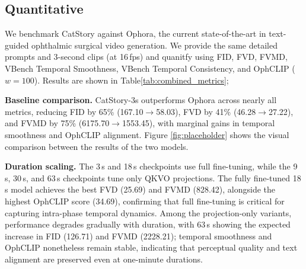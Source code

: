 \documentclass[runningheads]{llncs}
\begin{document}
\subsection{Quantitative}
We benchmark CatStory against Ophora\cite{LiWei_Ophora_MICCAI2025}, the current state-of-the-art in text-guided ophthalmic surgical video generation. We provide the same detailed prompts and 3-second clips (at 16\,fps) and quanitfy using FID, FVD, FVMD, VBench Temporal Smoothness, VBench Temporal Consistency, and OphCLIP\cite{hu2024ophcliphierarchicalretrievalaugmentedlearning} ($w{=}100$). Results are shown in Table\ref{tab:combined_metrics}; 

\noindent\textbf{Baseline comparison.} CatStory-3s outperforms Ophora across nearly all metrics, reducing FID by 65\% (167.10$\to$58.03), FVD by 41\% (46.28$\to$27.22), and FVMD by 75\% (6175.70$\to$1553.45), with marginal gains in temporal smoothness and OphCLIP alignment. Figure \ref{fig:placeholder} shows the visual comparison between the results of the two models.

\noindent\textbf{Duration scaling.} The 3\,s and 18\,s checkpoints use full fine-tuning, while the 9\,s, 30\,s, and 63\,s checkpoints tune only QKVO projections. The fully fine-tuned 18\,s model achieves the best FVD (25.69) and FVMD (828.42), alongside the highest OphCLIP score (34.69), confirming that full fine-tuning is critical for capturing intra-phase temporal dynamics. Among the projection-only variants, performance degrades gradually with duration, with 63\,s showing the expected increase in FID (126.71) and FVMD (2228.21); temporal smoothness and OphCLIP nonetheless remain stable, indicating that perceptual quality and text alignment are preserved even at one-minute durations.
\end{document}
